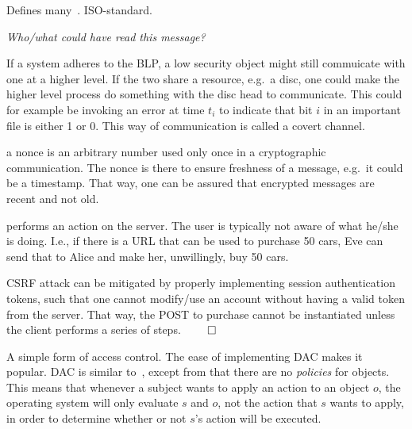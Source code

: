 \begin{definition}\label{cc}
    Defines many~. ISO-standard.
\end{definition}

\begin{definition}[Confidentiality]
    \textit{Who/what could have read this message?}
\end{definition}

\begin{definition}
    If a system adheres to the BLP, a low security object might still
    commuicate with one at a higher level. If the two share a resource,
    e.g.\ a disc, one could make the higher level process do something
    with the disc head to communicate. This could for example be invoking 
    an error at time $t_{i}$ to indicate that bit $i$ in an important file is
    either 1 or 0. This way of communication is called a covert channel.
\end{definition}


\begin{definition}\label{nonce}
    a nonce is an arbitrary number used only once in a cryptographic communication.
    The nonce is there to ensure freshness of a message, e.g.\ it could be a
    timestamp. That way, one can be assured that encrypted messages are
    recent and not old.
\end{definition}

\begin{definition}[CSRF]
    performs an action on the server. The user is typically not aware 
    of what he/she is doing. I.e., if there is a URL that can be used
    to purchase 50 cars, Eve can send that to Alice and make her, unwillingly,
    buy 50 cars.

    CSRF attack can be mitigated by properly implementing session authentication
    tokens, such that one cannot modify/use an account without having a 
    valid token from the server. That way, the POST to purchase cannot be
    instantiated unless the client performs a series of steps.
    $\qedhere$
\end{definition}

\begin{definition}\label{DAC}
    A simple form of access control. The ease of implementing DAC makes it popular.
    DAC is similar to~, except
    from that there are no \textit{policies} for objects. This means that
    whenever a subject wants to apply an action to an object $o$,
    the operating system will only evaluate $s$ and $o$, not the action that $s$ wants 
    to apply, in order to determine whether or not $s$'s action will be executed.
\end{definition}

